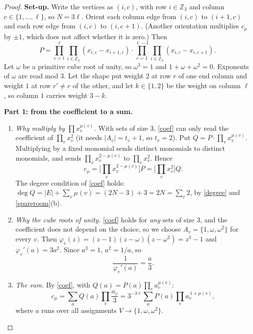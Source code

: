 \documentclass[11pt,oneside,openany]{book}
\newenvironment{steps}[1][]{\begin{enumerate}[label=\textbf{Step \arabic*.},leftmargin=4.2em,itemsep=0.3em,#1]}{\end{enumerate}}
\newcommand{\Z}{\mathbb{Z}}
\begin{document}
\begin{proof}
\textbf{Set-up.} Write the vertices as $(i, c)$, with row $i \in \Z_3$ and column $c \in \{1, \dots, \ell\}$, so
$N = 3\ell$. Orient each column edge from $(i, c)$ to $(i+1, c)$ and each row edge from $(i, c)$ to $(i, c+1)$.
(Another orientation multiplies $c_\mu$ by $\pm 1$, which does not affect whether it is zero.) Then
\[ P = \prod_{c=1}^{\ell} \prod_{i \in \Z_3} (x_{i,c} - x_{i+1,c}) \cdot \prod_{c=1}^{\ell-1} \prod_{i \in \Z_3} (x_{i,c} - x_{i,c+1}). \]
Let $\omega$ be a primitive cube root of unity, so $\omega^3 = 1$ and $1 + \omega + \omega^2 = 0$. Exponents of $\omega$ are
read mod 3. Let the shape put weight $2$ at row $r$ of one end column and weight $1$ at row $r' \ne r$ of the
other, and let $k \in \{1, 2\}$ be the weight on column $\ell$, so column $1$ carries weight $3 - k$.

\smallskip
\textbf{Part 1: from the coefficient to a sum.}
\begin{steps}
\item \emph{Why multiply by $\prod x_v^{\mu(v)}$.} With sets of size 3, \ref{coef} can only read the coefficient
of $\prod_v x_v^2$ (it needs $|A_v| = t_v + 1$, so $t_v = 2$). Put $Q = P \cdot \prod_v x_v^{\mu(v)}$. Multiplying by a
fixed monomial sends distinct monomials to distinct monomials, and sends $\prod_v x_v^{2-\mu(v)}$ to
$\prod_v x_v^2$. Hence
\[ c_\mu = \big[\textstyle\prod_v x_v^{2-\mu(v)}\big] P = \big[\textstyle\prod_v x_v^{2}\big] Q. \]
The degree condition of \ref{coef} holds: $\deg Q = |E| + \sum_v \mu(v) = (2N - 3) + 3 = 2N = \sum_v 2$, by
\ref{degree} and \ref{spareroom}(b).
\item \emph{Why the cube roots of unity.} \ref{coef} holds for \emph{any} sets of size 3, and the coefficient does
not depend on the choice, so we choose $A_v = \{1, \omega, \omega^2\}$ for every $v$. Then
$\varphi_v(z) = (z - 1)(z - \omega)(z - \omega^2) = z^3 - 1$ and $\varphi_v'(a) = 3a^2$. Since $a^3 = 1$, $a^2 = 1/a$, so
\[ \frac{1}{\varphi_v'(a)} = \frac{a}{3}. \]
\item \emph{The sum.} By \ref{coef}, with $Q(a) = P(a) \prod_v a_v^{\mu(v)}$:
\[ c_\mu = \sum_{a} Q(a) \prod_v \frac{a_v}{3} = 3^{-3\ell} \sum_{a} P(a) \prod_v a_v^{\,1 + \mu(v)}, \tag{$\ast$} \]
where $a$ runs over all assignments $V \to \{1, \omega, \omega^2\}$.
\end{steps}


\end{proof}
\end{document}
